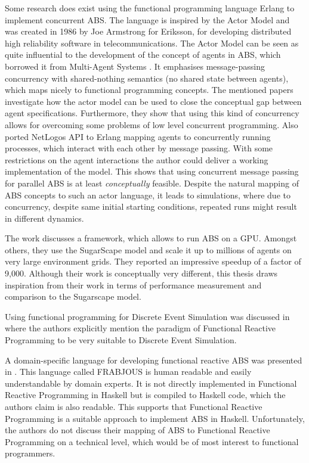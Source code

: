 Some research does exist \cite{di_stefano_using_2005, sher_agent-based_2013, varela_modelling_2004} using the functional programming language Erlang \cite{armstrong_erlang_2010} to implement concurrent ABS. The language is inspired by the Actor Model \cite{agha_actors:_1986} and was created in 1986 by Joe Armstrong for Eriksson, for developing distributed high reliability software in telecommunications. The Actor Model can be seen as quite influential to the development of the concept of agents in ABS, which borrowed it from Multi-Agent Systems \cite{wooldridge_introduction_2009}. It emphasises message-passing concurrency with shared-nothing semantics (no shared state between agents), which maps nicely to functional programming concepts. The mentioned papers investigate how the actor model can be used to close the conceptual gap between agent specifications. Furthermore, they show that using this kind of concurrency allows for overcoming some problems of low level concurrent programming.
Also \cite{bezirgiannis_improving_2013} ported NetLogos API to Erlang mapping agents to concurrently running processes, which interact with each other by message passing. With some restrictions on the agent interactions the author could deliver a working implementation of the model. This shows that using concurrent message passing for parallel ABS is at least \textit{conceptually} feasible. Despite the natural mapping of ABS concepts to such an actor language, it leads to simulations, where due to concurrency, despite same initial starting conditions, repeated runs might result in different dynamics.

The work \cite{lysenko_framework_2008} discusses a framework, which allows to run ABS on a GPU. Amongst others, they use the SugarScape model \cite{epstein_growing_1996} and scale it up to millions of agents on very large environment grids. They reported an impressive speedup of a factor of 9,000. Although their work is conceptually very different, this thesis draws inspiration from their work in terms of performance measurement and comparison to the Sugarscape model.

Using functional programming for Discrete Event Simulation was discussed in \cite{jankovic_functional_2007} where the authors explicitly mention the paradigm of Functional Reactive Programming to be very suitable to Discrete Event Simulation.

A domain-specific language for developing functional reactive ABS was presented in \cite{schneider_towards_2012,vendrov_frabjous_2014}. This language called FRABJOUS is human readable and easily understandable by domain experts. It is not directly implemented in Functional Reactive Programming in Haskell but is compiled to Haskell code, which the authors claim is also readable. This supports that Functional Reactive Programming is a suitable approach to implement ABS in Haskell. Unfortunately, the authors do not discuss their mapping of ABS to Functional Reactive Programming on a technical level, which would be of most interest to functional programmers.

